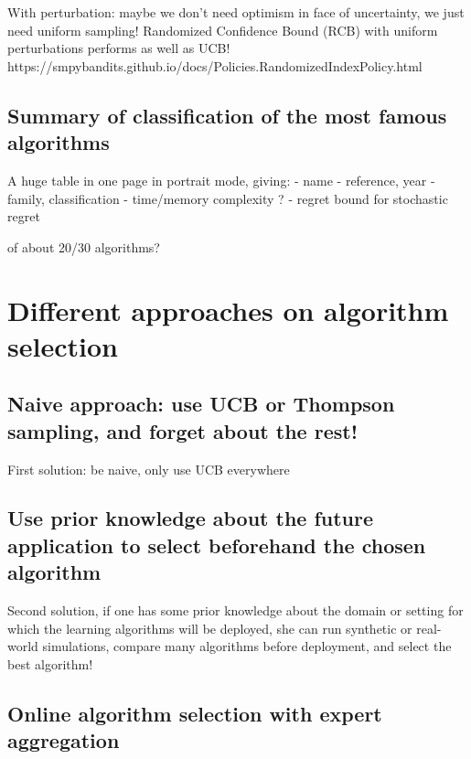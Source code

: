 With perturbation: maybe we don't need optimism in face of uncertainty, we just need uniform sampling!
Randomized Confidence Bound (RCB) with uniform perturbations performs as well as UCB!
https://smpybandits.github.io/docs/Policies.RandomizedIndexPolicy.html


\subsection{Summary of classification of the most famous algorithms}

A huge table in one page in portrait mode, giving:
- name
- reference, year
- family, classification
- time/memory complexity ?
- regret bound for stochastic regret

of about 20/30 algorithms?

\newpage

\section{Different approaches on algorithm selection}
\label{sec:2:chooseYourPreferredBanditAlgorithm}

\subsection{Naive approach: use UCB or Thompson sampling, and forget about the rest!}
First solution: be naive, only use UCB everywhere

\subsection{Use prior knowledge about the future application to select beforehand the chosen algorithm}
Second solution, if one has some prior knowledge about the domain or setting for which the learning algorithms will be deployed, she can run synthetic or real-world simulations, compare many algorithms before deployment, and select the best algorithm!

\subsection{Online algorithm selection with expert aggregation}





